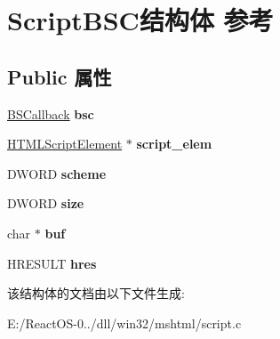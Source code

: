 \hypertarget{struct_script_b_s_c}{}\section{Script\+B\+S\+C结构体 参考}
\label{struct_script_b_s_c}
\subsection*{Public 属性}
\begin{DoxyCompactItemize}
\item 
\mbox{\label{struct_script_b_s_c_ac7c68d111caab8ffef8670552212dbbd}} 
\hyperlink{struct_b_s_callback}{B\+S\+Callback} {\bfseries bsc}
\item 
\mbox{\label{struct_script_b_s_c_a5ea1be8493bc3237987a88617f392061}} 
\hyperlink{struct_h_t_m_l_script_element}{H\+T\+M\+L\+Script\+Element} $\ast$ {\bfseries script\+\_\+elem}
\item 
\mbox{\label{struct_script_b_s_c_a3f03d5fd927d4263071366f502757456}} 
D\+W\+O\+RD {\bfseries scheme}
\item 
\mbox{\label{struct_script_b_s_c_afe518525a13d0d336f04c82daecd6cf6}} 
D\+W\+O\+RD {\bfseries size}
\item 
\mbox{\label{struct_script_b_s_c_afcc32936b5a6a392f786e06d72a73fe9}} 
char $\ast$ {\bfseries buf}
\item 
\mbox{\label{struct_script_b_s_c_a802b8ac2b1a418625402a8763cdeb595}} 
H\+R\+E\+S\+U\+LT {\bfseries hres}
\end{DoxyCompactItemize}


该结构体的文档由以下文件生成\+:\begin{DoxyCompactItemize}
\item 
E\+:/\+React\+O\+S-\/0../dll/win32/mshtml/script.\+c\end{DoxyCompactItemize}
